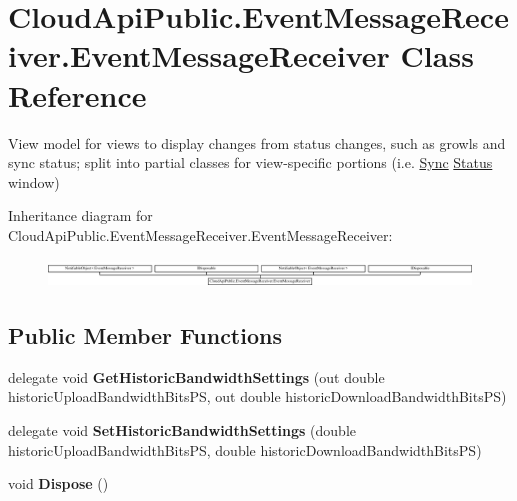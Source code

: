 \hypertarget{class_cloud_api_public_1_1_event_message_receiver_1_1_event_message_receiver}{\section{Cloud\-Api\-Public.\-Event\-Message\-Receiver.\-Event\-Message\-Receiver Class Reference}
\label{class_cloud_api_public_1_1_event_message_receiver_1_1_event_message_receiver}
}


View model for views to display changes from status changes, such as growls and sync status; split into partial classes for view-\/specific portions (i.\-e. \hyperlink{namespace_cloud_api_public_1_1_sync}{Sync} \hyperlink{namespace_cloud_api_public_1_1_event_message_receiver_1_1_status}{Status} window)  


Inheritance diagram for Cloud\-Api\-Public.\-Event\-Message\-Receiver.\-Event\-Message\-Receiver\-:\begin{figure}[H]
\begin{center}
\leavevmode
\includegraphics[height=0.731071cm]{class_cloud_api_public_1_1_event_message_receiver_1_1_event_message_receiver}
\end{center}
\end{figure}
\subsection*{Public Member Functions}
\begin{DoxyCompactItemize}
\item 
\hypertarget{class_cloud_api_public_1_1_event_message_receiver_1_1_event_message_receiver_a68dbda3ee375a1c953c3a3e4fe5a8334}{delegate void {\bfseries Get\-Historic\-Bandwidth\-Settings} (out double historic\-Upload\-Bandwidth\-Bits\-P\-S, out double historic\-Download\-Bandwidth\-Bits\-P\-S)}\label{class_cloud_api_public_1_1_event_message_receiver_1_1_event_message_receiver_a68dbda3ee375a1c953c3a3e4fe5a8334}

\item 
\hypertarget{class_cloud_api_public_1_1_event_message_receiver_1_1_event_message_receiver_afd8ef0a309c7f9e241c8bbc244b819a2}{delegate void {\bfseries Set\-Historic\-Bandwidth\-Settings} (double historic\-Upload\-Bandwidth\-Bits\-P\-S, double historic\-Download\-Bandwidth\-Bits\-P\-S)}\label{class_cloud_api_public_1_1_event_message_receiver_1_1_event_message_receiver_afd8ef0a309c7f9e241c8bbc244b819a2}

\item 
\hypertarget{class_cloud_api_public_1_1_event_message_receiver_1_1_event_message_receiver_aec1cf65af718c9bc660ae7eb1b48dabf}{void {\bfseries Dispose} ()}\label{class_cloud_api_public_1_1_event_message_receiver_1_1_event_message_receiver_aec1cf65af718c9bc660ae7eb1b48dabf}

\end{DoxyCompactItemize}
